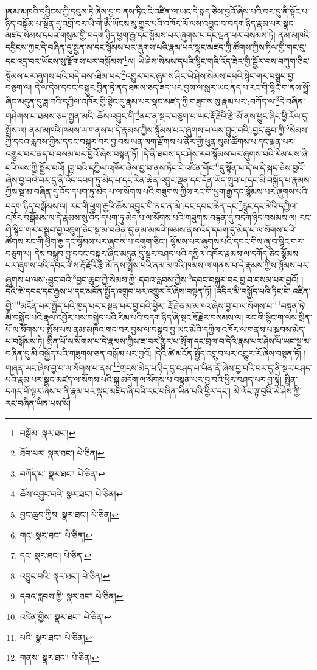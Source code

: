 །ནམ་མཁའི་དབྱིངས་ཀྱི་དབུས་ཏེ་ཞེས་བྱ་བ་ནས་ཏིང་ངེ་འཛིན་ལ་ཡང་དེ་སྐད་ཅེས་བྱའོ་ཞེས་པའི་བར་དུ་ནི་སྟོང་པ་ཉིད་བསྒོམ་པ་སྔོན་དུ་འགྲོ་བར་ཡི་གེ་ཨོཾ་ཡོངས་སུ་གྱུར་པའི་འཁོར་ལོ་ལས་འབྱུང་བ་བདག་ཉིད་རྣམ་པར་སྣང་མཛད་སེམས་དཔའ་གསུམ་གྱི་བདག་ཉིད་ཕྱག་རྒྱ་དང་སྙོམས་པར་ཞུགས་པ་དང་ལྡན་པར་བསམས་ཏེ། ནམ་མཁའི་དབྱིངས་ཀྱང་དེ་བཞིན་དུ་སྤྱན་མ་དང་སྙོམས་པར་ཞུགས་པའི་རྣམ་པར་སྣང་མཛད་ཀྱི་ཚོགས་ཀྱིས་ཏིལ་གྱི་གང་བུ་དང་འདྲ་བར་ཡོངས་སུ་རྫོགས་པར་བསྒོམས་\footnote{བསྒོམ་  སྣར་ཐང་། }ལ། ཡེ་ཤེས་སེམས་དཔའི་སྙིང་གའི་འོད་ཟེར་གྱི་སྦྱོར་བས་བཀུག་ཅིང་སྙོམས་པར་ཞུགས་པའི་བདེ་བས་:ཐིམ་པར་\footnote{ཐོབ་པར་  སྣར་ཐང་།  པེ་ཅིན། }འགྱུར་བར་ཞུགས་ཤིང་ཡེ་ཤེས་སེམས་དཔའི་སྙིང་གར་བསྒྲུབ་བྱ་བཅུག་ལ། དེ་ལ་དེས་དབང་བསྐུར་བྱིན་ཏེ་ནད་ཐམས་ཅད་ཟད་པར་བྱས་ལ་སླར་ཡང་ནད་པ་རང་གི་སྙིང་ག་ནས་སྤྲོ་ཞིང་མདུན་དུ་ཟླ་བའི་དཀྱིལ་འཁོར་གྱི་སྟེང་དུ་རྣམ་པར་སྣང་མཛད་ཀྱི་གཟུགས་སུ་རྣམ་པར་:བཀོད་ལ་\footnote{བཀོད་པ་  སྣར་ཐང་།  པེ་ཅིན། }དེ་བཞིན་གཤེགས་པ་ཐམས་ཅད་སྤྱན་མའི་:ཆོས་འབྱུང་གི་\footnote{ཆོས་འབྱུང་བའི་  སྣར་ཐང་།  པེ་ཅིན། }ནང་ན་སྔར་བཅུག་པ་ཡང་རྡོ་རྗེའི་རྩེ་མོ་ནས་ཕྱུང་ཞིང་ཕྱི་རོལ་དུ་སྤྲོས་ལ། ནམ་མཁའི་ཁམས་ལ་གནས་པ་དེ་རྣམས་ཀྱིས་སྙོམས་པར་ཞུགས་པ་ལས་བྱུང་བའི་:བྱང་ཆུབ་ཀྱི་\footnote{བྱང་ཆུབ་ཀྱིས་  སྣར་ཐང་།  པེ་ཅིན། }སེམས་ཀྱི་དབའ་རླབས་ཀྱིས་དབང་བསྐུར་བར་བྱ་བས་ཡན་ལག་རྫོགས་པ་ནོར་གྱི་ཕུན་སུམ་ཚོགས་པ་དང་ལྡན་པར་འགྱུར་བར་ནད་པ་བསམ་པར་བྱའོ་ཞེས་བསྟན་ཏོ། །དེ་ནི་ཐབས་དང་ཤེས་རབ་སྙོམས་པར་ཞུགས་པའི་རིམ་པས་ཞི་བའི་ལས་ཀྱི་སྦྱོར་བའོ། །ཟླ་བའི་དཀྱིལ་འཁོར་ཞེས་བྱ་བ་ནས་ཏིང་ངེ་འཛིན་གོང་\footnote{གང་  སྣར་ཐང་།  པེ་ཅིན། }དུ་སྟོན་པ་དེ་ལ་དེ་སྐད་ཅེས་བྱའོ་ཞེས་བྱ་བའི་བར་དུ་ནི་འོད་དཔག་ཏུ་མེད་པ་དང་རིན་ཆེན་འབྱུང་ལྡན་དང་དོན་ཡོད་གྲུབ་པ་དང་མི་བསྐྱོད་པ་རྣམས་ཀྱིས་སྔ་མ་བཞིན་དུ་འོད་དཔག་ཏུ་མེད་པ་ལ་སོགས་པའི་གཟུགས་ཀྱིས་རང་གི་ཕྱག་རྒྱ་དང་སྙོམས་པར་ཞུགས་པའི་བདག་ཉིད་བསྒོམས་ལ། རང་གི་ཕྱག་རྒྱའི་ཆོས་འབྱུང་གི་ནང་ན་མེ་:དང་དབང་ཆེན་དང་\footnote{དང་  སྣར་ཐང་།  པེ་ཅིན། }རླུང་དང་མེའི་དཀྱིལ་འཁོར་བསྒོམས་ལ་དེ་རྣམས་སུ་འོད་དཔག་ཏུ་མེད་པ་ལ་སོགས་པའི་གཟུགས་བརྙན་དུ་བདག་ཉིད་བསམས་ལ། རང་གི་སྙིང་གར་བསྒྲུབ་བྱ་འཇུག་ཅིང་སྔ་མ་བཞིན་དུ་ནམ་མཁའི་ཁམས་ནས་འོད་དཔག་དུ་མེད་པ་ལ་སོགས་པའི་ཚོགས་རང་གི་ཕྱག་རྒྱ་དང་སྙོམས་པར་ཞུགས་པ་དགུག་ཅིང་། སྙོམས་པར་ཞུགས་པའི་དབང་གིས་ཞུ་བ་སྙིང་གར་བཅུག་པ། དེས་བསྒྲུབ་བྱ་དབང་བསྐུར་ཞིང་མདུན་དུ་སྔར་བཤད་པའི་དཀྱིལ་འཁོར་རྣམས་ལ་དགོད་ཅིང་སྙོམས་པར་ཞུགས་པའི་དབང་གིས་རྡོ་རྗེའི་རྩེ་མོ་ནས་སྤྲོས་པའི་ནམ་མཁའི་ཁམས་ལ་གནས་པ་དེ་རྣམས་ཀྱིས་སྙོམས་པར་ཞུགས་པ་ལས་:བྱུང་བའི་\footnote{འབྱུང་བའི་  སྣར་ཐང་།  པེ་ཅིན། }བྱང་ཆུབ་ཀྱི་སེམས་ཀྱི་:དབའ་རླབས་ཀྱིས་\footnote{དབའ་རླབས་ཀྱི་  སྣར་ཐང་།  པེ་ཅིན། }དབང་བསྐུར་བར་བྱ་བ་བསམ་པར་བྱའོ། །དེའི་ཚེ་དབང་དང་རྒྱས་པ་དང་མངོན་སྤྱོད་འགྲུབ་པར་འགྱུར་རོ་ཞེས་བསྟན་ཏོ། །འདིར་མི་བསྐྱོད་པའི་ཏིང་ངེ་:འཛིན་གྱི་\footnote{འཛིན་གྱིས་  སྣར་ཐང་།  པེ་ཅིན། }མངོན་པར་སྤྱོད་པའི་ཁྱད་པར་བསྟན་པར་བྱ་བའི་ཕྱིར། རྡོ་རྗེ་ནམ་མཁའ་ཞེས་བྱ་བ་ལ་སོགས་པ་\footnote{པའི་  སྣར་ཐང་།  པེ་ཅིན། }བསྟན་ཏེ། མི་བསྐྱོད་པའི་རྣལ་འབྱོར་པས་བསྐྱེད་པའི་རིམ་པའི་བདག་ཉིད་ཞེ་སྡང་རྡོ་རྗེར་བསམས་ལ། རང་གི་སྙིང་ག་ལས་སྲིན་པོ་ལ་སོགས་པ་སྤྲོས་པས་ནམ་མཁའ་གང་བར་བྱས་ལ་བསྒྲུབ་བྱ་ཡང་མེའི་དཀྱིལ་འཁོར་ལ་གནས་པ་སྐྱབས་མེད་པ་བསྒོམས་ཏེ། སྲིན་པོ་ལ་སོགས་པ་དེ་རྣམས་ཀྱིས་ཟ་བར་གྱུར་པ་སྲོག་དང་བྲལ་བ་དེའི་རྣམ་པར་ཤེས་པ་ཡང་སྔ་མ་བཞིན་དུ་མི་བསྐྱོད་པའི་གཟུགས་ཅན་བསྒོམ་པར་བྱའོ། །དེའི་ཚེ་མངོན་སྤྱོད་འགྲུབ་པར་འགྱུར་རོ་ཞེས་བསྟན་ཏོ། །གཞན་ཡང་ཞེས་བྱ་བ་ལ་སོགས་པ་ནས་\footnote{གནས་  སྣར་ཐང་།  པེ་ཅིན། }གྲངས་མེད་པ་ཉིད་དུ་བཤད་པ་ཡིན་ནོ་ཞེས་བྱ་བའི་བར་དུ་ནི་སྔར་བཤད་པའི་རྣམ་པར་སྣང་མཛད་ལ་སོགས་པའི་སྐུ་མདོག་ལ་སོགས་པ་བསྟན་པར་བྱ་བའི་ཕྱིར་བཤད་པར་བྱ་སྟེ། སྤྲིན་དཀར་པོ་ལྟར་ཞེས་པ་ནི་རྣམ་པར་སྣང་མཛད་ཞི་བའི་རང་བཞིན་ཡིན་པའི་ཕྱིར་དང་། མེ་ལོང་ལྟ་བུའི་ཡེ་ཤེས་ཀྱི་རང་བཞིན་ཡིན་པས་སོ། 